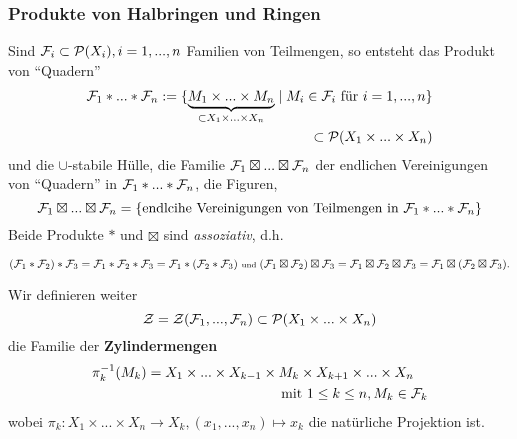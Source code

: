 \subsubsection{Produkte von Halbringen und Ringen}
Sind $\mathcal{F}_i \subset \mathcal{P}(X_i), i=1,...,n$ Familien von Teilmengen, so entsteht das Produkt von ``Quadern''
\begin{equation*}
\begin{split}
\mathcal{F}_1 \ast ... \ast \mathcal{F}_n := \{ \underbrace{M_1 \times ... \times M_n}_{\subset X_1 \times ... \times X_n} \mid M_i \in \mathcal{F}_i \text{ für } i=1,...,n\}  \\ \subset  \mathcal{P}(X_1 \times ... \times X_n)
\end{split}
\end{equation*}
und die $\cup$-stabile Hülle, die Familie $\mathcal{F}_1 \boxtimes ... \boxtimes \mathcal{F}_n$ der endlichen Vereinigungen von ``Quadern'' in $\mathcal{F}_1 \ast ... \ast \mathcal{F}_n$, die Figuren, 
\begin{equation*}
\mathcal{F}_1 \boxtimes ... \boxtimes \mathcal{F}_n = \left\{\text{endlcihe Vereinigungen von Teilmengen in } \mathcal{F}_1 \ast ... \ast \mathcal{F}_n	\right\}
\end{equation*}
Beide Produkte $\ast$ und $\boxtimes$ sind \emph{assoziativ}, d.h.\begin{small}
\begin{equation*}
(\mathcal{F}_1 \ast \mathcal{F}_2) \ast \mathcal{F}_3 = \mathcal{F}_1 \ast \mathcal{F}_2 \ast \mathcal{F}_3 = \mathcal{F}_1 \ast (\mathcal{F}_2 \ast \mathcal{F}_3)
\text{ \scriptsize und }
(\mathcal{F}_1 \boxtimes \mathcal{F}_2) \boxtimes \mathcal{F}_3 = \mathcal{F}_1 \boxtimes \mathcal{F}_2 \boxtimes \mathcal{F}_3 = \mathcal{F}_1 \boxtimes (\mathcal{F}_2 \boxtimes \mathcal{F}_3).
\end{equation*}
\end{small}
Wir definieren weiter
\begin{equation*}
\mathcal{Z} = 
\mathcal{Z} (\FF_1,...,\FF_n) \subset \PP(X_1 \times ...\times X_n) %
\end{equation*}
die Familie der \textbf{Zylindermengen}
\begin{equation*}
\begin{split}
\pi_k^{-1}(M_k) = X_1 \times ... \times X_{k-1} \times M_k \times X_{k+1} \times ... \times X_n \quad\\ \text{mit } 1 \leq k \leq n, M_k \in \mathcal{F}_k
\end{split}
\end{equation*}
wobei $\pi_k: X_1 \times ... \times X_n \to X_k, (x_1,...,x_n) \mapsto x_k$ die natürliche Projektion ist. \\
